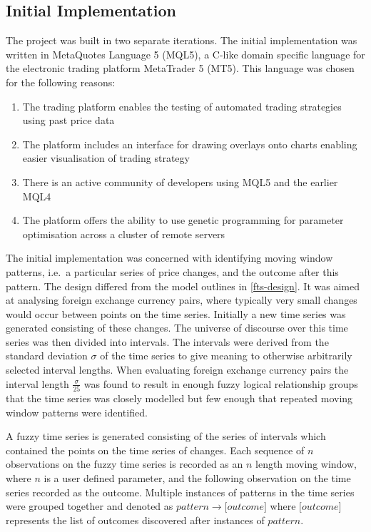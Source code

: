 \documentclass[12pt]{article}
\theoremstyle{definition}
\begin{document}
\label{implementation}

\subsection{Initial Implementation}

The project was built in two separate iterations. The initial implementation was written in MetaQuotes Language 5 (MQL5), a C-like domain specific language for the electronic trading platform MetaTrader 5 (MT5). This language was chosen for the following reasons:

\begin{enumerate}[label=\roman*]
\item The trading platform enables the testing of automated trading strategies using past price data
\item The platform includes an interface for drawing overlays onto charts enabling easier visualisation of trading strategy
\item There is an active community of developers using MQL5 and the earlier MQL4
\item The platform offers the ability to use genetic programming for parameter optimisation across a cluster of remote servers 
\end{enumerate}

The initial implementation was concerned with identifying moving window patterns, i.e.\ a particular series of price changes, and the outcome after this pattern. The design differed from the model outlines in \cref{fts-design}. It was aimed at analysing foreign exchange currency pairs, where typically very small changes would occur between points on the time series. Initially a new time series was generated consisting of these changes. The universe of discourse over this time series was then divided into intervals. The intervals were derived from the standard deviation $\sigma$ of the time series to give meaning to otherwise arbitrarily selected interval lengths. When evaluating foreign exchange currency pairs the interval length $\frac{\sigma}{25}$ was found to result in enough fuzzy logical relationship groups that the time series was closely modelled but few enough that repeated moving window patterns were identified.

A fuzzy time series is generated consisting of the series of intervals which contained the points on the time series of changes. Each sequence of $n$ observations on the fuzzy time series is recorded as an $n$ length moving window, where $n$ is a user defined parameter, and the following observation on the time series recorded as the outcome. Multiple instances of patterns in the time series were grouped together and denoted as $pattern \rightarrow \lbrack outcome\rbrack$ where $\lbrack outcome\rbrack$ represents the list of outcomes discovered after instances of $pattern$.
\end{document}
